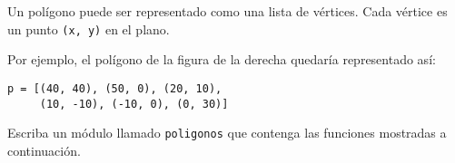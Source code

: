 Un polígono puede ser representado
como una lista de vértices.
Cada vértice es un punto \verb!(x, y)!
en el plano.

\begin{minipage}[T]{0.7\textwidth}
  Por ejemplo,
  el polígono de la figura de la derecha
  quedaría representado así:
  \begin{lstlisting}
p = [(40, 40), (50, 0), (20, 10),
     (10, -10), (-10, 0), (0, 30)]
  \end{lstlisting}

  Escriba un módulo llamado \texttt{poligonos}
  que contenga las funciones
  mostradas a continuación.
\end{minipage}
\hfill
\begin{minipage}[T]{0.25\textwidth}
\end{minipage}



